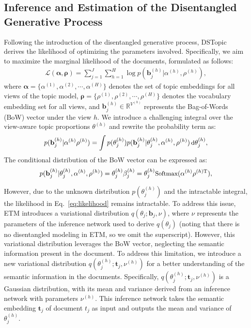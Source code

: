 
\subsection{Inference and Estimation of the Disentangled Generative Process}
Following the introduction of the disentangled generative process, DSTopic derives the likelihood of optimizing the parameters involved. Specifically, we aim to maximize the marginal likelihood of the documents, formulated as follows:
\begin{align}
    \mathcal{L}(\bm{\alpha}, \bm{\rho}) = \sum_{j=1}^J \sum_{h=1}^H \log p(\mathbf{b}_j^{(h)} | \alpha^{(h)}, \rho^{(h)}),
    \label{eq:likelihood}
\end{align}
where $ \bm{\alpha} = \{\alpha^{(1)}, \alpha^{(2)}, \cdots, \alpha^{(H)}\} $ denotes the set of topic embeddings for all views of the topic model, $ \bm{\rho} = \{\rho^{(1)}, \rho^{(2)}, \cdots, \rho^{(H)}\} $ denotes the vocabulary embedding set for all views, and $ \mathbf{b}_j^{(h)} \in \mathbb{R}^{V^{(h)}} $ represents the Bag-of-Words (BoW) vector under the view $ h $. We introduce a challenging integral over the view-aware topic proportions $ \theta^{(h)} $ and rewrite the probability term as:
\begin{align}
\small
    p(\mathbf{b}_j^{(h)} | \alpha^{(h)} \rho^{(h)}) = \int p(\theta_j^{(h)}) p(\mathbf{b}_j^{(h)} | \theta_j^{(h)}, \alpha^{(h)}, \rho^{(h)}) \, \text{d}\theta_j^{(h)},
\end{align}
The conditional distribution of the BoW vector can be expressed as:
\begin{align}
\small 
    p(\mathbf{b}_j^{(h)} | \theta_j^{(h)}, \alpha^{(h)}, \rho^{(h)}) = \theta_j^{(h)} \beta_j^{(h)} = \theta_j^{(h)} \text{Softmax}(\alpha^{(h)} \rho^{(h)\mathrm{T}}),
\end{align}

However, due to the unknown distribution $ p(\theta_j^{(h)}) $ and the intractable integral, the likelihood in Eq.~\ref{eq:likelihood} remains intractable. To address this issue, ETM \cite{dieng2020topic} introduces a variational distribution $ q(\theta_j; \mathbf{b}_j, \nu) $, where $ \nu $ represents the parameters of the inference network used to derive $ q(\theta_j) $ (noting that there is no disentangled modeling in ETM, so we omit the superscript). However, this variational distribution leverages the BoW vector, neglecting the semantic information present in the document. To address this limitation, we introduce a new variational distribution $ q(\theta_j^{(h)}; \mathbf{t}_j, \nu^{(h)}) $ for a better understanding of the semantic information in the documents. Specifically, $ q(\theta_j^{(h)}; \mathbf{t}_j, \nu^{(h)}) $ is a Gaussian distribution, with its mean and variance derived from an inference network with parameters $ \nu^{(h)} $. This inference network takes the semantic embedding $ \mathbf{t}_j $ of document $ t_j $ as input and outputs the mean and variance of $ \theta_j^{(h)} $.


